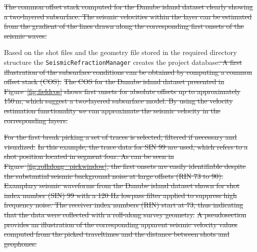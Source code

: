 \documentclass[a4paper,fleqn]{cas-sc}
\providecommand{\DIFdel}[1]{{\protect\color{red}\sout{#1}}}                      %
\providecommand{\DIFdelbegin}{} %
\providecommand{\DIFdelend}{} %
\providecommand{\DIFdelFL}[1]{\DIFdel{#1}} %
\newcommand{\DIFscaledelfig}{0.5}
\newlength{\DIFdelgraphicswidth} %
\newlength{\DIFdelgraphicsheight} %
\newcommand{\DIFdelincludegraphics}[2][]{%
\sbox{\DIFdelgraphicsbox}{\DIFOincludegraphics[#1]{#2}}%
\settoboxwidth{\DIFdelgraphicswidth}{\DIFdelgraphicsbox} %
\settoboxtotalheight{\DIFdelgraphicsheight}{\DIFdelgraphicsbox} %
\scalebox{\DIFscaledelfig}{%
\parbox[b]{\DIFdelgraphicswidth}{\usebox{\DIFdelgraphicsbox}\\[-\baselineskip] \rule{\DIFdelgraphicswidth}{0em}}\llap{\resizebox{\DIFdelgraphicswidth}{\DIFdelgraphicsheight}{%
\setlength{\unitlength}{\DIFdelgraphicswidth}%
\begin{picture}(1,1)%
\thicklines\linethickness{2pt} %
{\color[rgb]{1,0,0}\put(0,0){\framebox(1,1){}}}%
{\color[rgb]{1,0,0}\put(0,0){\line( 1,1){1}}}%
{\color[rgb]{1,0,0}\put(0,1){\line(1,-1){1}}}%
\end{picture}%
}\hspace*{3pt}}} %
} %
\DeclareRobustCommand{\DIFdelbegin}{\DIFOdelbegin \let\includegraphics\DIFdelincludegraphics} %
\DeclareRobustCommand{\DIFdelend}{\DIFOaddend \let\includegraphics\DIFOincludegraphics} %
\begin{document}
{%
\DIFdelFL{The common offset stack computed for the Danube island dataset clearly showing a two-layered subsurface. The seismic velocities within the layer can be estimated from the gradient of the lines drawn along the corresponding first onsets of the seismic waves.}}

\DIFdelend Based on the shot files and the geometry file stored in the required directory structure the \texttt{SeismicRefractionManager} creates the project database\DIFdelbegin \DIFdel{.
A first illustration of the subsurface conditions can be obtained by computing a common offset stack (COS):
}%
\DIFdel{The COS for the Danube island dataset presented in Figure~\ref{fig:fieldcos} shows first onsets for absolute offsets up to approximately 150\,m, which suggest a two-layered subsurface model. By using the velocity estimation functionality we can approximate the seismic velocity in the corresponding layers.
}%

\DIFdel{For the first break picking a set of traces is selected, filtered if necessary and visualized:
}%
\DIFdel{In this example, the trace data for SIN 99 are used, which refers to a shot position located in segment four. 
As can be seen in Figure~\ref{fig:rollalong_pickwindow}, the first onsets are easily identifiable despite the substantial seismic background noise at large offsets (RIN 73 to 90).
}%
{%
\DIFdelFL{Examplary seismic waveforms from the Danube island dataset shown for shot index number (SIN) 99 with a 120 Hz lowpass filter applied to suppress high frequency noise. The receiver index numbers (RIN) start at 73, thus indicating that the data were collected with a roll-along survey geometry.}}
\DIFdel{A pseudosection provides an illustration of the corresponding apparent seismic velocity values computed from the picked traveltimes and the distance between shots and geophones:
}%
\end{document}
